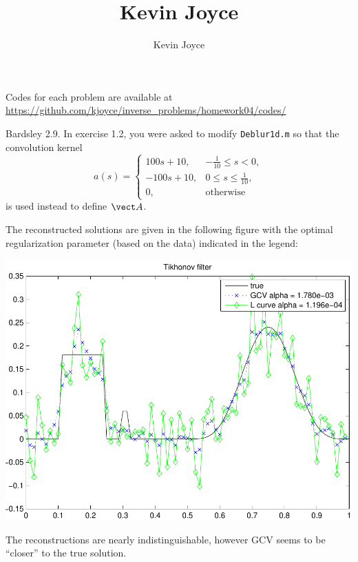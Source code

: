 \documentclass{homework}
\title{Kevin Joyce}
\author{Kevin Joyce}
\begin{document}
 
\newcommand{\figref}[1]{\figurename~\ref{#1}}
\renewcommand{\bar}{\overline}
\renewcommand{\hat}{\widehat}
\renewcommand{\SS}{\mathcal S}
\newcommand{\HH}{\mathscr H}
\newcommand{\mom}{\widetilde}
\newcommand{\mle}{\widehat \Uptheta}
\newcommand{\eps}{\varepsilon}
\newcommand{\todist}{\stackrel{D}\longrightarrow}
\newcommand{\toprob}{\stackrel{p}\longrightarrow}
\newcommand{\TTheta}{\overline{\underline \Theta} }
\newcommand{\del}{\partial}
\newcommand{\approxsim}{\overset{\cdotp}{\underset{\cdotp}{\sim}}}

Codes for each problem are available at \url{https://github.com/kjoyce/inverse_problems/homework04/codes/}

\begin{longproblem} 
Bardsley 2.9. In exercise 1.2, you were asked to modify \texttt{Deblur1d.m} so that the convolution kernel
$$
  a(s) = \begin{cases}
  100s + 10,  &-\frac 1{10} \le s < 0,\\
  -100s + 10, &0\le s \le \frac 1{10},\\
  0,	      &\text{otherwise}
  \end{cases}
$$
is used instead to define $\vect A$.

\begin{solution} 
The reconstructed solutions are given in the following figure with the optimal regularization parameter (based on the data) indicated in the legend:
\begin{center}
\includegraphics[width=.4\textwidth]{29a_reconstruction.pdf}
\end{center}
The reconstructions are nearly indistinguishable, however GCV seems to be ``closer'' to the true solution. 
\end{solution}


\end{longproblem}
\end{document}
